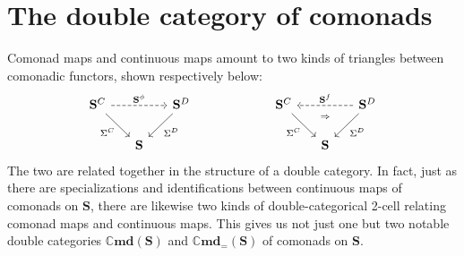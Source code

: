 \documentclass[11pt, oneside, article]{memoir}
\theoremstyle{plain}
\theoremstyle{definition}
\theoremstyle{remark}
\newenvironment{remark}
{\renewcommand\qedsymbol{$\lrcorner$}%
  \pushQED{\qed}\myremark}
{\popQED\endmyremark}
\DeclarePairedDelimiter{\abs}{\lvert}{\rvert}
\newcommand{\namedcat}[1]{\mathbf{#1}}
\newcommand{\cat}[1]{\mathbf{#1}}
\newcommand{\Set}{\namedcat{Set}}
\newcommand{\Cmd}{\mathbb{C}\namedcat{md}}
\newcommand{\CmdId}{\Cmd_=}
\newcommand{\CoalgOn}[2]{{#2}^{#1}}
\newcommand{\CoalgS}[1]{\CoalgOn{#1}{\bS}}
\newcommand{\pts}[1]{{\abs{#1}}}
\newcommand{\one}[1]{\pts{#1}}
\newcommand{\carr}{\Sigma}
\newcommand{\reindex}[1]{\Delta_{#1}}
\newcommand{\car}[1]{\carr^{#1}}
\newcommand{\carC}{\car{\cC}}
\newcommand{\carD}{\car{\cD}}
\newcommand{\com}[2]{{#1}^{#2}}
\newcommand{\con}[2]{{#1}^{#2}}
\newcommand{\cmnd}[1]{{#1}}
\newcommand{\xX}{X}
\newcommand{\cC}{\cmnd{C}}
\newcommand{\cD}{\cmnd{D}}
\newcommand{\bS}{\cat{S}}
\newcommand{\CS}{\CoalgS{\cC}}
\newcommand{\DS}{\CoalgS{\cD}}
\newcommand{\final}{terminal-object-preserving}
\newcommand{\cartesian}{cartesian}
\begin{document}


\section{The double category of comonads}\label{sec:double}

Comonad maps and continuous maps amount to two kinds of triangles
between comonadic functors, shown respectively below:
\[
  \begin{tikzcd}[column sep=15pt]
    \CS\ar["\com{\bS}{\phi}", rr, dashed]\ar[dr, "\carC"']&&\DS\ar[dl, "\carD"]\\
    &\bS
  \end{tikzcd}
  \qquad\qquad\qquad
  \begin{tikzcd}[column sep=15pt]
    \CS && \DS \\
    & \bS
    \arrow["\con{\bS}{f}"', dashed, from=1-3, to=1-1]
    \arrow["\carC"', ""{name=0, anchor=center, inner sep=0}, from=1-1, to=2-2]
    \arrow["\carD", ""{name=1, anchor=center, inner sep=0}, from=1-3, to=2-2]
    \arrow["\Rightarrow", shift right=10pt, draw=none, from=1, to=0]
  \end{tikzcd}
\]
The two are related together in the structure of a double category. In
fact, just as there are specializations and identifications between
continuous maps of comonads on $\bS$, there are likewise two kinds of
double-categorical 2-cell relating comonad maps and continuous
maps. This gives us not just one but two notable double categories
$\Cmd(\bS)$ and $\CmdId(\bS)$ of comonads on $\bS$.
\end{document}
